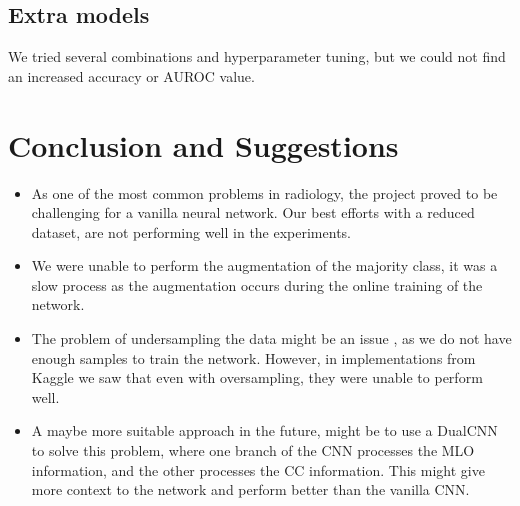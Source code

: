 \documentclass[conference]{IEEEtran}
\begin{document}
\subsection{Extra models}
We tried several combinations and hyperparameter tuning, but we could not find an increased accuracy or AUROC value. 

\section{Conclusion and Suggestions}

\begin{itemize}
\item As one of the most common problems in radiology, the project proved to be challenging for a vanilla neural network. Our best efforts with a reduced dataset, are not performing well in the experiments. 

\item We were unable to perform the augmentation of the majority class, it was a slow process as the augmentation occurs during the online training of the network. 

\item The problem of undersampling the data might be an issue \cite{Goodfellow2016}, as we do not have enough samples to train the network. However, in implementations from Kaggle we saw that even with oversampling, they were unable to perform well. 

\item A maybe more suitable approach in the future, might be to use a DualCNN to solve this problem, where one branch of the CNN processes the MLO information, and the other processes the CC information. This might give more context to the network and perform better than the vanilla CNN.
\end{itemize}

 
\end{document}
